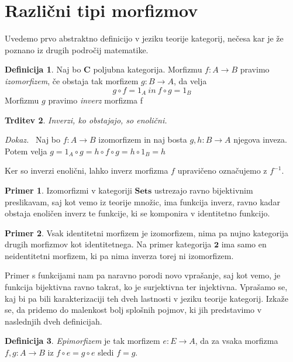 \documentclass[12pt,a4paper]{book}
\theoremstyle{definition}
\newtheorem{definicija}{Definicija}[chapter]
\theoremstyle{plain}
\newtheorem{trditev}[definicija]{Trditev}
\newenvironment{dokaz}{\emph{Dokaz.}\ }{\hspace{\fill}{$\Box$}}
\theoremstyle{definition}
\newtheorem*{primer*}{Primer}
\theoremstyle{remark}
\newcommand{\cat}[1]{\textbf{#1}}
\begin{document}
\section{Različni tipi morfizmov}
Uvedemo prvo abstraktno definicijo v jeziku teorije kategorij, nečesa kar je že poznano iz drugih področij matematike.

\begin{definicija} Naj bo \cat{C} poljubna kategorija. Morfizmu $f : A \to B$ pravimo \emph{izomorfizem}, če obstaja tak morfizem $g : B \to A$, da velja
$$g \circ f = 1_A \ in \ f \circ g = 1_B$$
Morfizmu $g$ pravimo \emph{inverz} morfizma f
\end{definicija}

\begin{trditev} Inverzi, ko obstajajo, so enolični.
\end{trditev}
\begin{dokaz}
Naj bo $f : A \to B$ izomorfizem in naj bosta $g,h: B \to A$ njegova inveza. Potem velja $g = 1_A \circ g = h \circ f \circ g = h \circ 1_B = h$
\end{dokaz}

Ker so inverzi enolični, lahko inverz morfizma $f$ upravičeno označujemo z $f^{-1}$.

\begin{primer*}
Izomorfizmi v kategoriji $\cat{Sets}$ ustrezajo ravno bijektivnim preslikavam, saj kot vemo iz teorije množic, ima funkcija inverz, ravno kadar obstaja enoličen inverz te funkcije, ki se komponira v identitetno funkcijo. 
\end{primer*}

\begin{primer*}
Vsak identitetni morfizem je izomorfizem, nima pa nujno kategorija drugih morfizmov kot identitetnega. Na primer kategorija $\cat{2}$ ima samo en neidentitetni morfizem, ki pa nima inverza torej ni izomorfizem.
\end{primer*}

Primer s funkcijami nam pa naravno porodi novo vprašanje, saj kot vemo, je funkcija bijektivna ravno takrat, ko je surjektivna ter injektivna. Vprašamo se, kaj bi pa bili karakterizaciji teh dveh lastnosti v jeziku teorije kategorij. Izkaže se, da pridemo do malenkost bolj splošnih pojmov, ki jih predstavimo v naslednjih dveh definicijah.

\begin{definicija}
\emph{Epimorfizem} je tak morfizem $e : E \to A$, da za vsaka morfizma $f,g : A \to B$ iz $f \circ e = g \circ e$ sledi $f = g$.
\end{definicija}
\end{document}

